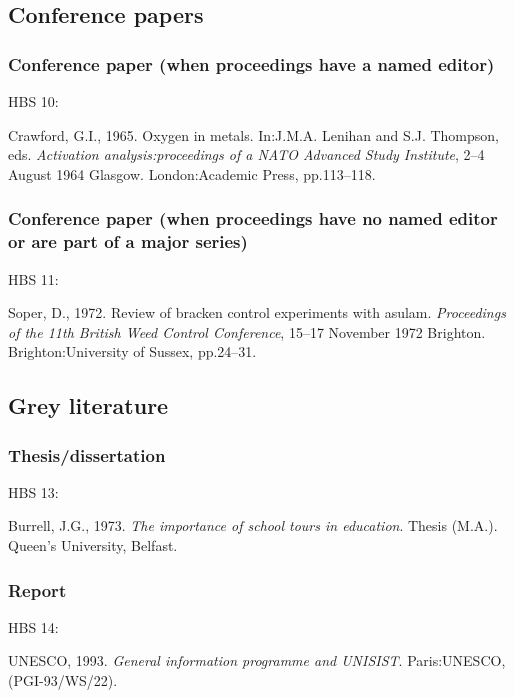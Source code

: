 \subsection{Conference papers}

\subsubsection*{Conference paper (when proceedings have a named editor)}

HBS 10: \cite{crawford1965oim}

Crawford, G.I., 1965. Oxygen in metals. In:\@ J.M.A. Lenihan and S.J. Thompson, eds. \emph{Activation analysis:\@ proceedings of a NATO Advanced Study Institute}, 2--4 August 1964 Glasgow. London:\@ Academic Press, pp.113--118.



\subsubsection*{Conference paper (when proceedings have no named editor or are part of a major series)}

HBS 11: \cite{soper1972rbc}

Soper, D., 1972. Review of bracken control experiments with asulam. \emph{Proceedings of the 11th British Weed Control Conference}, 15--17 November 1972 Brighton. Brighton:\@ University of Sussex, pp.24--31.



\subsection{Grey literature}

\subsubsection*{Thesis/dissertation}

HBS 13: \cite{burrell1973ist}

Burrell, J.G., 1973. \emph{The importance of school tours in education}. Thesis (M.A.). Queen's University, Belfast.



\subsubsection*{Report}

HBS 14: \cite{unesco1993gip}

UNESCO, 1993. \emph{General information programme and UNISIST}\@. Paris:\@ UNESCO, (PGI-93/WS/22).



